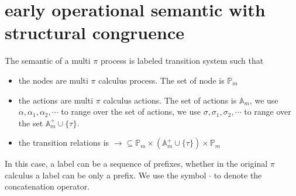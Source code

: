 \section{early operational semantic with structural congruence}

The semantic of a multi $\pi$ process is labeled transition system such that
\begin{itemize}
  \item 
    the nodes are multi $\pi$ calculus process. The set of node is $\mathbb{P}_{m}$
  \item
    the actions are multi $\pi$ calculus actions. The set of actions is $\mathbb{A}_{m}$, we use $\alpha, \alpha_{1}, \alpha_{2},\cdots $ to range over the set of actions, we use $\sigma, \sigma_{1}, \sigma_{2}, \cdots $ to range over the set $\mathbb{A}_{m}^{+} \cup \{\tau\}$.
  \item
    the transition relations is $\rightarrow\subseteq \mathbb{P}_{m}\times (\mathbb{A}_{m}^{+} \cup \{\tau\})\times \mathbb{P}_{m}$
\end{itemize}

In this case, a label can be a sequence of prefixes, whether in the original $\pi$ calculus a label can be only a prefix. We use the symbol $\cdot$ to denote the concatenation operator.

